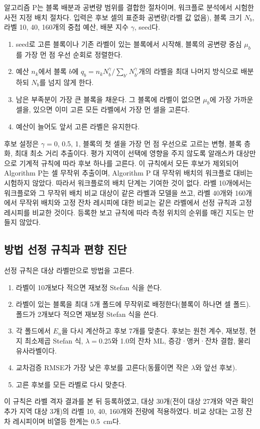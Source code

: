알고리즘 P는 블록 배분과 공변량 범위를 결합한 절차이며, 워크플로 분석에서 시험한 사전 지정 배치 절차다. 입력은 후보 셀의 표준화 공변량(라벨 값 없음), 블록 크기 $N_b$, 라벨 10, 40, 160개의 중첩 예산, 배분 지수 $\gamma$, seed다.
\begin{enumerate}
\item seed로 고른 블록이나 기존 라벨이 있는 블록에서 시작해, 블록의 공변량 중심 $\mu_b$를 가장 먼 점 우선 순회로 정렬한다.
\item 예산 $n_k$에서 블록 $b$에 $q_b = n_k N_b^{\gamma} / \sum_{b'} N_{b'}^{\gamma}$개의 라벨을 최대 나머지 방식으로 배분하되 $N_b$를 넘지 않게 한다.
\item 남은 부족분이 가장 큰 블록을 채운다. 그 블록에 라벨이 없으면 $\mu_b$에 가장 가까운 셀을, 있으면 이미 고른 모든 라벨에서 가장 먼 셀을 고른다.
\item 예산이 늘어도 앞서 고른 라벨은 유지한다.
\end{enumerate}
후보 설정은 $\gamma = 0$, 0.5, 1, 블록의 첫 셀을 가장 먼 점 우선으로 고르는 변형, 블록 층화, 최대 최소 거리 추출이다. 평가 지역이 선택에 영향을 주지 않도록 알래스카 대상만으로 기계적 규칙에 따라 후보 하나를 고른다. 이 규칙에서 모든 후보가 제외되어 Algorithm P는 셀 무작위 추출이며, Algorithm P 대 무작위 배치의 워크플로 대비는 시험하지 않았다. 따라서 워크플로의 배치 단계는 기여한 것이 없다. 라벨 10개에서는 워크플로와 그 무작위 배치 비교 대상이 같은 라벨과 모델을 쓰고, 라벨 40개와 160개에서 무작위 배치와 고정 잔차 레시피에 대한 비교는 같은 라벨에서 선정 규칙과 고정 레시피를 비교한 것이다. 등록한 보고 규칙에 따라 측정 위치의 순위를 매긴 지도는 만들지 않았다.

\subsection{방법 선정 규칙과 편향 진단}\label{sec:m-selection}

선정 규칙은 대상 라벨만으로 방법을 고른다.
\begin{enumerate}
\item 라벨이 10개보다 적으면 재보정 Stefan 식을 쓴다.
\item 라벨이 있는 블록을 최대 5개 폴드에 무작위로 배정한다(블록이 하나면 셀 폴드). 폴드가 2개보다 적으면 재보정 Stefan 식을 쓴다.
\item 각 폴드에서 $E_n$을 다시 계산하고 후보 7개를 맞춘다. 후보는 원천 계수, 재보정, 현지 최소제곱 Stefan 식, $\lambda = 0.25$와 1.0의 잔차 ML, 증강·앵커·잔차 결합, 물리 유사라벨이다.
\item 교차검증 RMSE가 가장 낮은 후보를 고른다(동률이면 작은 $\lambda$와 앞선 후보).
\item 고른 후보를 모든 라벨로 다시 맞춘다.
\end{enumerate}
이 규칙은 라벨 격자 결과를 본 뒤 등록하였고, 대상 30개(전이 대상 27개와 약관 확인 추가 지역 대상 3개)의 라벨 10, 40, 160개와 전량에 적용하였다. 비교 상대는 고정 잔차 레시피이며 비열등 한계는 0.5~cm다.

